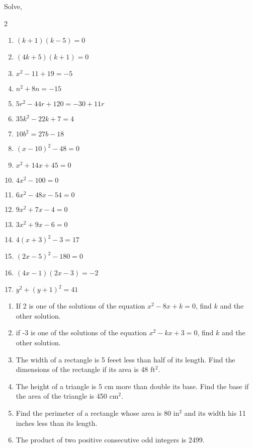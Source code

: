 \documentclass[12pt]{article}
\newenvironment{problem}[2][Problem]{\begin{trivlist}
\item[\hskip \labelsep {\bfseries #1}\hskip \labelsep {\bfseries #2.}]}{\end{trivlist}}
\begin{document}
\begin{problem}{2}
  Solve,
  \begin{multicols}{2}
  \begin{enumerate}[label=\roman*)]
  \item $(k+1)(k-5) = 0$
  \item $(4k+5)(k+1)=0$
  \item $x^2 - 11 + 19=-5$
  \item $n^2 + 8n = -15$
  \item $5r^2-44r + 120 = -30+11r$
  \item $35k^2 - 22k + 7=4$
  \item $10b^2 = 27 b -18$
  \item $(x-10)^2 - 48 = 0$
  \item $x^2 + 14x + 45=0$
  \item $4x^2-100=0$
  \item $6x^2-48x-54=0$
  \item $9x^2+7x-4=0$
  \item $3x^2+9x-6=0$
  \item $4(x+3)^2-3=17$
  \item $ (2x-5)^2-180=0$
  \item $(4x-1)(2x-3)=-2$
  \item $y^2+(y+1)^2 = 41$
  \end{enumerate}
\end{multicols}
\end{problem}

\begin{problem}{3}
  \begin{enumerate}[label=\roman*)]
  \item If 2 is one of the solutions of the equation $x^2-8x+k=0$, find $k$ and the other solution.
    \item if -3 is one of the solutions of the equation $x^2-kx+3=0$, find $k$ and the other solution.
  \item The width of a rectangle is 5 feeet less than half of its length.  Find the dimensions of the rectangle if its area is 48 ft$^2$.
  \item The height of a triangle is 5 cm more than double its base.  Find the base if the area of the triangle is 450 cm$^2$.
  \item Find the perimeter of a rectangle whose area is 80 in$^2$ and its width his 11 inches less than its length.
    \item The product of two positive consecutive odd integers is 2499.  

  \end{enumerate}

\end{problem}
\end{document}
